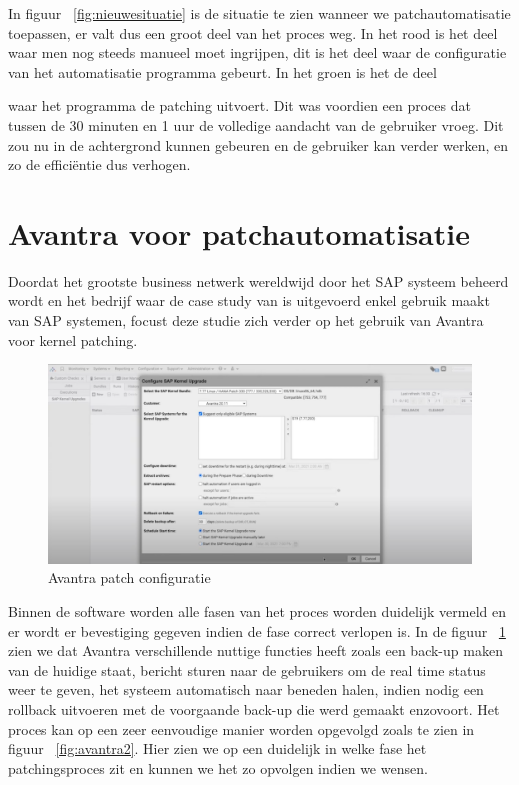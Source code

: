 In figuur ~\ref{fig:nieuwesituatie} is de situatie te zien wanneer we patchautomatisatie toepassen, er valt dus een groot deel van het proces weg. In het rood is het deel waar men nog steeds manueel moet ingrijpen, dit is het deel waar de configuratie van het automatisatie programma gebeurt. In het groen is het de deel 

waar het programma de patching uitvoert. Dit was voordien een proces dat tussen de 30 minuten en 1 uur de volledige aandacht van de gebruiker vroeg. Dit zou nu in de achtergrond kunnen gebeuren en de gebruiker kan verder werken, en zo de efficiëntie dus verhogen. \\

\section{Avantra voor patchautomatisatie}
Doordat het grootste business netwerk wereldwijd door het SAP systeem beheerd wordt \autocite{Laborde2024} en het bedrijf waar de case study van is uitgevoerd enkel gebruik maakt van SAP systemen, focust deze studie zich verder op het gebruik van Avantra voor kernel patching.

\begin{figure}[h]
    \centering
    \includegraphics[width=\textwidth]{avantra1.png}
    \caption{Avantra patch configuratie}
     \label{fig:avantra1}
\end{figure}
\newpage


Binnen de software worden alle fasen van het proces worden duidelijk vermeld en er wordt er bevestiging gegeven indien de fase correct verlopen is. In de figuur ~\ref{fig:avantra1} zien we dat Avantra verschillende
nuttige functies heeft zoals een back-up maken van de huidige staat, bericht sturen naar de gebruikers om de real time status weer
   te geven, het systeem automatisch naar beneden halen, indien nodig een rollback uitvoeren met de voorgaande back-up die werd gemaakt enzovoort. Het proces kan op een zeer eenvoudige manier worden opgevolgd zoals te zien in figuur ~\ref{fig:avantra2}. Hier zien we op een duidelijk in welke fase het patchingsproces zit en kunnen we het zo opvolgen indien we wensen.\\

